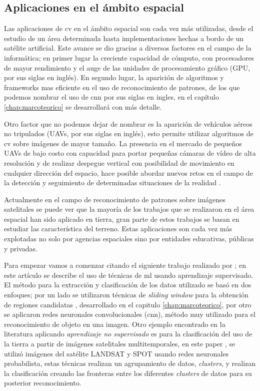 \subsection{Aplicaciones en el ámbito espacial}\label{sub:estadodelacuestion}

Las aplicaciones de \ac{cv} en el ámbito espacial son cada vez más utilizadas, desde el estudio de un área determinada hasta implementaciones hechas a bordo de un satélite artificial. Este avance se dio gracias a diversos factores en el campo de la informática; en primer lugar la creciente capacidad de cómputo, con procesadores de mayor rendimiento y el auge de las unidades de procesamiento gráfico (GPU, por sus siglas en inglés). En segundo lugar, la aparición de algoritmos y frameworks mas eficiente en el uso de reconocimiento de patrones, de los que podemos nombrar el uso de \ac{cnn} por sus siglas en ingles, en el capítulo \ref{chap:marcoteorico} se desarrollará con más detalle. 

Otro factor que no podemos dejar de nombrar es la aparición de vehículos aéreos no tripulados (UAVs, por sus siglas en inglés), esto permite utilizar algoritmos de \ac{cv} sobre imágenes de mayor tamaño. La presencia en el mercado de pequeños UAVs de bajo costo con capacidad para portar pequeñas cámaras de vídeo de alta resolución y de realizar despegue vertical con posibilidad de movimiento en cualquier dirección del espacio, hace posible abordar nuevos retos en el campo de la detección y seguimiento de determinadas situaciones de la realidad \citep{Lanillos}.

Actualmente en el campo de reconocimiento de patrones sobre imágenes satelitales se puede ver que la mayoría de los trabajos que se realizaron en el área espacial han sido aplicado en tierra, gran parte de estos trabajos se basan en estudiar las característica del terreno. Estas aplicaciones son cada vez más explotadas no solo por agencias espaciales sino por entidades educativas, públicas y privadas. 

Para empezar vamos a comenzar citando el siguiente trabajo realizado por \citep{Cheang}; en este artículo se describe el uso de técnicas de \ac{ml} usando aprendizaje supervisado. El método para la extracción y clasificación de los datos utilizado se basó en dos enfoques; por un lado se utilizaron técnicas de \textit{sliding window}  \citep{sliding_windows} para la obtención de regiones candidatas , desarrollado en el capitulo \ref{chap:marcoteorico}, por otro se aplicaron redes neuronales convolucionales (\ac{cnn}), método muy utilizado para el reconocimiento de objeto en una imagen. Otro ejemplo encontrado en la literatura aplicando  \textit{aprendizaje no supervisado} es para la clasificación del uso de la tierra a partir de imágenes satelitales multitemporales, en este paper \citep{pnn}, se utilizó imágenes del satélite LANDSAT y SPOT usando redes neuronales probabilista, estas técnicas realizan un agrupamiento de datos, \textit{clusters}, y realizan la clasificación creando las fronteras entre los diferentes \textit{clusters} de datos para su posterior reconocimiento.

